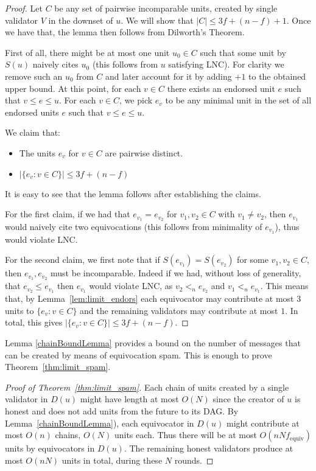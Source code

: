 \documentclass[12pt, fleqn]{article}
\begin{document}
\begin{proof}
Let $C$ be any set of pairwise incomparable units, created by single validator $V$ in the downset of $u$.
%
We will show that $|C|\leq 3f+(n-f)+1$. Once we have that, the lemma then follows from Dilworth's Theorem.

First of all, there might be at most one unit $u_0\in C$ such that some unit by $S(u)$ naively cites $u_0$ (this follows from $u$ satisfying LNC).
%
For clarity we remove such an $u_0$ from $C$ and later account for it by adding $+1$ to the obtained upper bound.
%
At this point, for each $v\in C$ there exists an endorsed unit $e$ such that $v\leq e \leq u$.
%
For each $v\in C$, we pick $e_v$ to be any minimal unit in the set of all endorsed units $e$ such that $v \leq e \leq u$.

We claim that:
\begin{itemize}
    \item The units $e_v$ for $v\in C$ are pairwise distinct.
    \item $|\{e_v : v\in C\}| \leq 3f+(n-f)$
\end{itemize}
It is easy to see that the lemma follows after establishing the claims.

For the first claim, if we had that $e_{v_1} = e_{v_2}$ for $v_1, v_2\in C$ with $v_1\neq v_2$, then $e_{v_1}$ would naively cite two equivocations (this follows from minimality of $e_{v_1}$), thus would violate LNC.

For the second claim, we first note that if $S(e_{v_1})=S(e_{v_2})$ for some $v_1, v_2 \in C$, then $e_{v_1}, e_{v_2}$ must be incomparable.
%
Indeed if we had, without loss of generality, that $e_{v_2} \leq e_{v_1}$ then $e_{v_1}$ would violate LNC, as $v_2 <_n e_{v_2}$ and $v_1<_n e_{v_1}$.
%
This means that, by Lemma~\ref{lem:limit_endors} each equivocator may contribute at most $3$ units to $\{e_v: v\in C\}$ and the remaining validators may contribute at most $1$.
%
In total, this gives $|\{e_v: v\in C\}|\leq 3f+(n-f)$.
\end{proof}

Lemma \ref{chainBoundLemma} provides a bound on the number of messages that can be created by means of equivocation spam. This is enough to prove Theorem~\ref{thm:limit_spam}.




\begin{proof}[Proof of Theorem~\ref{thm:limit_spam}]
Each chain of units created by a single validator in $D(u)$ might have length at most $O(N)$ since the creator of $u$ is honest and does not add units from the future to its DAG.
%
By Lemma~\ref{chainBoundLemma}), each equivocator in $D(u)$ might contribute at most $O(n)$ chains, $O(N)$ units each.
%
Thus there will be at most $O(nNf_{\mathrm{equiv}})$ units by equivocators in $D(u)$. 
%
The remaining honest validators produce at most $O(nN)$ units in total, during these $N$ rounds.
\end{proof}
\end{document}
